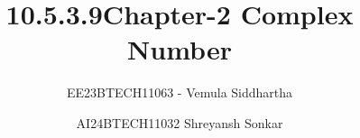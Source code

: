 \documentclass[journal]{IEEEtran}
\begin{document}

\vspace{3cm}

\title{10.5.3.9}
\author{EE23BTECH11063 - Vemula Siddhartha
}



\renewcommand{\thefigure}{\theenumi}
\renewcommand{\thetable}{\theenumi}
\setlength{\intextsep}{10pt} %


\renewcommand{\thetable}{\theenumi}

\title{Chapter-2 Complex Number}
\author{AI24BTECH11032 Shreyansh Sonkar
}
\maketitle
\renewcommand{\thefigure}{\theenumi}
\renewcommand{\thetable}{\theenumi}
\end{document}
